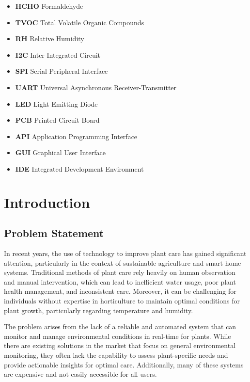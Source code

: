 \documentclass[12pt,a4paper,oneside,english]{book}
\begin{document}
\begin{itemize}
\item \textbf{HCHO} Formaldehyde
\item \textbf{TVOC} Total Volatile Organic Compounds
\item \textbf{RH} Relative Humidity
\item \textbf{I2C} Inter-Integrated Circuit
\item \textbf{SPI} Serial Peripheral Interface
\item \textbf{UART} Universal Asynchronous Receiver-Transmitter
\item \textbf{LED} Light Emitting Diode
\item \textbf{PCB} Printed Circuit Board
\item \textbf{API} Application Programming Interface
\item \textbf{GUI} Graphical User Interface
\item \textbf{IDE} Integrated Development Environment
\end{itemize}

\mainmatter






\chapter{Introduction}
\section{Problem Statement}
In recent years, the use of technology to improve plant care has gained significant attention, particularly in the context of sustainable agriculture and smart home systems. Traditional methods of plant care rely heavily on human observation and manual intervention, which can lead to inefficient water usage, poor plant health management, and inconsistent care. Moreover, it can be challenging for individuals without expertise in horticulture to maintain optimal conditions for plant growth, particularly regarding temperature and humidity.

The problem arises from the lack of a reliable and automated system that can monitor and manage environmental conditions in real-time for plants. While there are existing solutions in the market that focus on general environmental monitoring, they often lack the capability to assess plant-specific needs and provide actionable insights for optimal care. Additionally, many of these systems are expensive and not easily accessible for all users.
\end{document}
